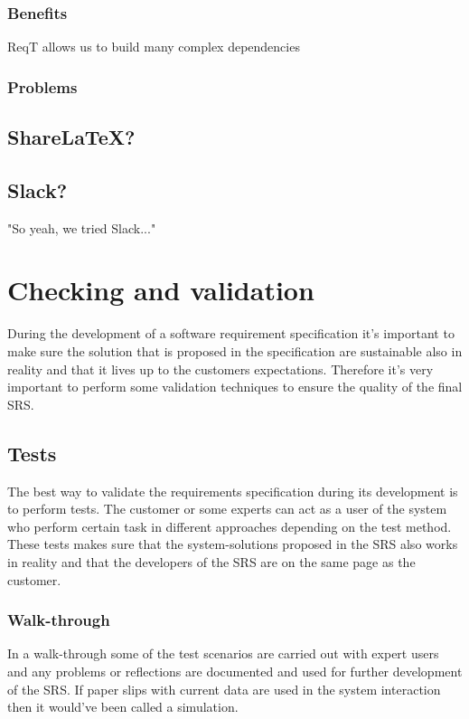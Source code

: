 \documentclass[10pt]{article}
\begin{document}
\subsubsection{Benefits}
ReqT allows us to build many complex dependencies
\subsubsection{Problems}

\subsection{ShareLaTeX?}

\subsection{Slack?}
"So yeah, we tried Slack..."

\section{Checking and validation}
\noindent
During the development of a software requirement specification it's important to make sure the solution that is proposed in the specification are sustainable also in reality and that it lives up to the customers expectations. Therefore it's very important to perform some validation techniques to ensure the quality of the final SRS.
\subsection{Tests}
The best way to validate the requirements specification during its development is to perform tests. The customer or some experts can act as a user of the system who perform certain task in different approaches depending on the test method. These tests makes sure that the system-solutions proposed in the SRS also works in reality and that the developers of the SRS are on the same page as the customer.

\subsubsection{Walk-through}
In a walk-through some of the test scenarios are carried out with expert users and any problems or reflections are documented and used for further development of the SRS. If paper slips with current data are used in the system interaction then it would've been called a simulation.
\end{document}
